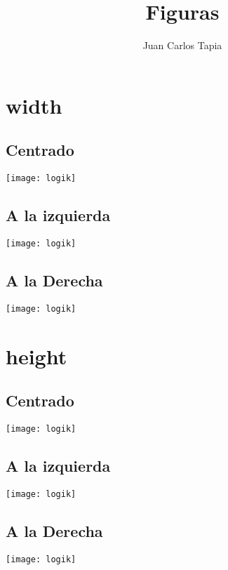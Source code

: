 \documentclass[11pt,a4paper]{article}
\author{Juan Carlos Tapia}
\title{Figuras}
\begin{document}
\maketitle
\tableofcontents
\listoffigures
\listoftables

\section{width}
\subsection{Centrado}
\begin{center}
\texttt{[image: logik]}
\end{center}

\subsection{A la izquierda}
\begin{flushleft}
\texttt{[image: logik]}
\end{flushleft}


\subsection{A la Derecha}
\begin{flushright}
\texttt{[image: logik]}
\end{flushright}


\section{height}
\subsection{Centrado}
\begin{center}
\texttt{[image: logik]}
\end{center}


\subsection{A la izquierda}
\begin{flushleft}
\texttt{[image: logik]}
\end{flushleft}

\subsection{A la Derecha}
\begin{flushright}
\texttt{[image: logik]}
\end{flushright}
\end{document}
